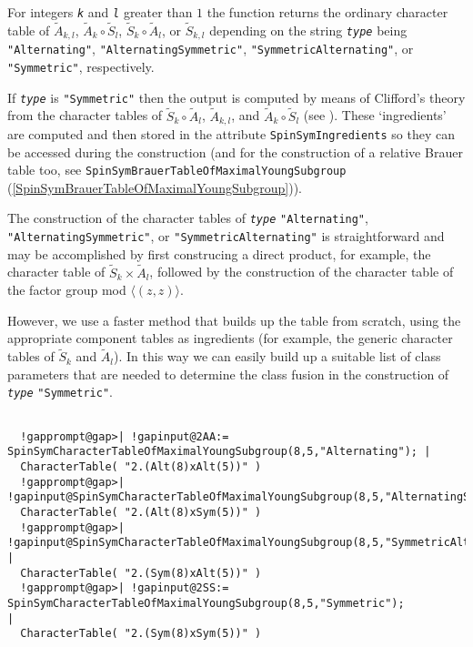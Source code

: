 \documentclass[a4paper,11pt]{report}
\begin{document}
{{{ For integers \mbox{\texttt{\mdseries\slshape k}} and \mbox{\texttt{\mdseries\slshape l}} greater than $1$ the function returns the ordinary character table of $\tilde{A}_{k,l}$, $\tilde{A}_k\circ\tilde{S}_l$, $\tilde{S}_k\circ\tilde{A}_l$, or $\tilde{S}_{k,l}$ depending on the string \mbox{\texttt{\mdseries\slshape type}} being \texttt{"Alternating"}, \texttt{"AlternatingSymmetric"}, \texttt{"SymmetricAlternating"}, or \texttt{"Symmetric"}, respectively.

 If \mbox{\texttt{\mdseries\slshape type}} is \texttt{"Symmetric"} then the output is computed by means of Clifford's theory from the character
tables of $\tilde{S}_k\circ\tilde{A}_l$, $\tilde{A}_{k,l}$, and $\tilde{A}_k\circ\tilde{S}_l$ (see \cite[Section 5.2]{Maas2011}). These `ingredients' are computed and then stored in the attribute \texttt{SpinSymIngredients} so they can be accessed during the construction (and for the construction of a
relative Brauer table too, see \texttt{SpinSymBrauerTableOfMaximalYoungSubgroup} (\ref{SpinSymBrauerTableOfMaximalYoungSubgroup})). 

 The construction of the character tables of \mbox{\texttt{\mdseries\slshape type}} \texttt{"Alternating"}, \texttt{"AlternatingSymmetric"}, or \texttt{"SymmetricAlternating"} is straightforward and may be accomplished by first construcing a direct
product, for example, the character table of $\tilde{S}_k\times\tilde{A}_{l}$, followed by the construction of the character table of the factor group mod $\langle(z,z)\rangle$.

 However, we use a faster method that builds up the table from scratch, using
the appropriate component tables as ingredients (for example, the generic
character tables of  $\tilde{S}_k$ and  $\tilde{A}_l$). In this way we can easily build up a suitable list of class parameters that
are needed to determine the class fusion in the construction of \mbox{\texttt{\mdseries\slshape type}} \texttt{"Symmetric"}. }

 
\begin{Verbatim}[commandchars=!@|,fontsize=\small,frame=single,label=Example]
  
  !gapprompt@gap>| !gapinput@2AA:= SpinSymCharacterTableOfMaximalYoungSubgroup(8,5,"Alternating"); |
  CharacterTable( "2.(Alt(8)xAlt(5))" )
  !gapprompt@gap>| !gapinput@SpinSymCharacterTableOfMaximalYoungSubgroup(8,5,"AlternatingSymmetric");|
  CharacterTable( "2.(Alt(8)xSym(5))" )
  !gapprompt@gap>| !gapinput@SpinSymCharacterTableOfMaximalYoungSubgroup(8,5,"SymmetricAlternating");     |
  CharacterTable( "2.(Sym(8)xAlt(5))" )
  !gapprompt@gap>| !gapinput@2SS:= SpinSymCharacterTableOfMaximalYoungSubgroup(8,5,"Symmetric");           |
  CharacterTable( "2.(Sym(8)xSym(5))" )
  

\end{Verbatim}}}
\end{document}
